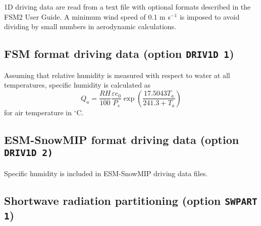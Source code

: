 \documentclass[fleqn]{article}
\begin{document}
1D driving data are read from a text file with optional formats described in the FSM2 User Guide. A minimum wind speed of 0.1 m s$^{-1}$ is imposed to avoid dividing by small numbers in aerodynamic calculations.

\subsection{FSM format driving data (option {\tt DRIV1D 1})}

Assuming that relative humidity is measured with respect to water at all temperatures, specific humidity is calculated as
\begin{equation}
Q_a = \frac{RH}{100}\frac{\varepsilon e_0}{P_s}\exp\left(\frac{17.5043T_a}{241.3 + T_a}\right)
\end{equation}
for air temperature in $^\circ$C.

\subsection{ESM-SnowMIP format driving data (option {\tt DRIV1D 2)}}

Specific humidity is included in ESM-SnowMIP driving data files.


\subsection{Shortwave radiation partitioning (option {\tt SWPART 1})}
\end{document}
